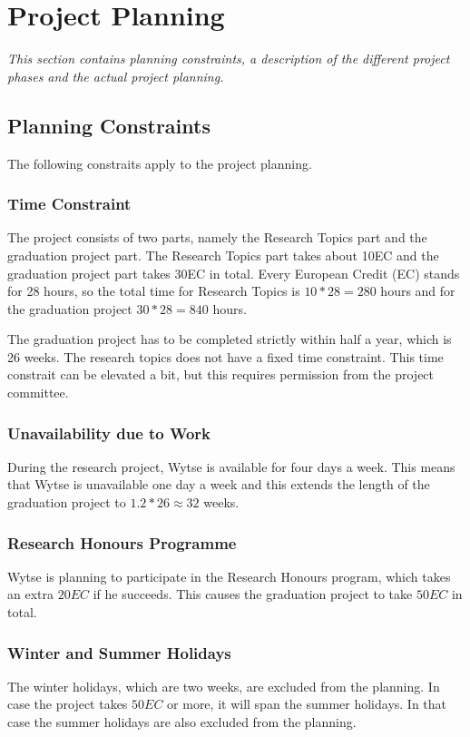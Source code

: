 \chapter{Project Planning}

\textit{This section contains planning constraints, a description of the different project phases and the actual project planning.}

\section{Planning Constraints}
The following constraits apply to the project planning.

\subsection{Time Constraint}
The project consists of two parts, namely the Research Topics part and the graduation project part. The Research Topics part takes about 10EC and the graduation project part takes 30EC in total. Every European Credit (EC) stands for 28 hours, so the total time for Research Topics is $10*28 = 280$ hours and for the graduation project $30 * 28 = 840$ hours.

The graduation project has to be completed strictly within half a year, which is 26 weeks. The research topics does not have a fixed time constraint. This time constrait can be elevated a bit, but this requires permission from the project committee. 

\subsection{Unavailability due to Work}
During the research project, Wytse is available for four days a week. This means that Wytse is unavailable one day a week and this extends the length of the graduation project to $1.2 * 26 \approx 32$ weeks.

\subsection{Research Honours Programme}
Wytse is planning to participate in the Research Honours program, which takes an extra $20EC$ if he succeeds. This causes the graduation project to take $50EC$ in total.

\subsection{Winter and Summer Holidays}
The winter holidays, which are two weeks, are excluded from the planning. In case the project takes $50EC$ or more, it will span the summer holidays. In that case the summer holidays are also excluded from the planning.

